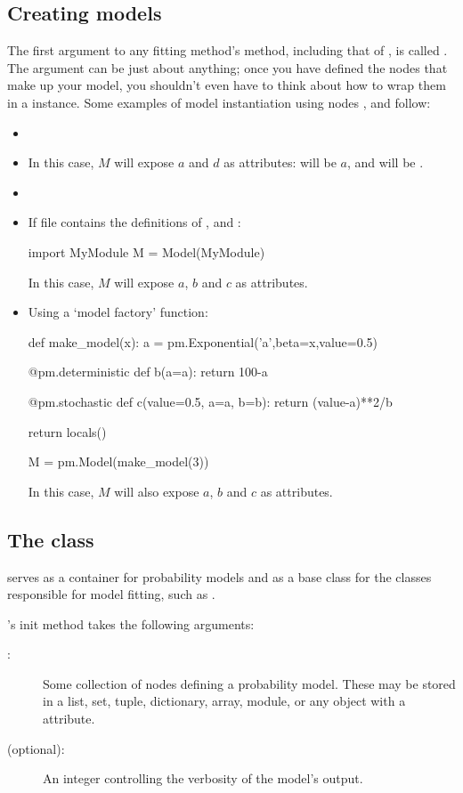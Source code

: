 \documentclass[]{jss}
\begin{document}
\subsection{Creating models} \label{sec:ModelInstantiation}
The first argument to any fitting method's  method, including that of , is called . The  argument can be just about anything; once you have defined the nodes that make up your model, you shouldn't even have to think about how to wrap them in a  instance. Some examples of model instantiation using nodes ,  and  follow:
\begin{itemize}
    \item {}
    \item {} In this case, $M$ will expose $a$ and $d$ as attributes:  will be $a$, and  will be \code{[b,c]}.
    \item {}
    \item If file  contains the definitions of ,  and :
   \begin{CodeInput}
import MyModule
M = Model(MyModule)
\end{CodeInput}
    In this case, $M$ will expose $a$, $b$ and $c$ as attributes.
    \item Using a `model factory' function:
    \begin{CodeInput}
def make_model(x):
	a = pm.Exponential('a',beta=x,value=0.5)

@pm.deterministic
def b(a=a):
    return 100-a

@pm.stochastic
def c(value=0.5, a=a, b=b):
    return (value-a)**2/b

return locals()

M = pm.Model(make_model(3))
\end{CodeInput}
    In this case, $M$ will also expose $a$, $b$ and $c$ as attributes.
\end{itemize}

\subsection[The Model class]{The  class} \label{sec:Model}
 serves as a container for probability models and as a base class for the classes responsible for model fitting, such as .

's init method takes the following arguments:
\begin{description}
    \item[:] Some collection of  nodes defining a probability model. These may be stored in a list, set, tuple, dictionary, array, module, or any object with a  attribute.
    \item[ (optional):] An integer controlling the verbosity of the model's output.
\end{description}
\end{document}
